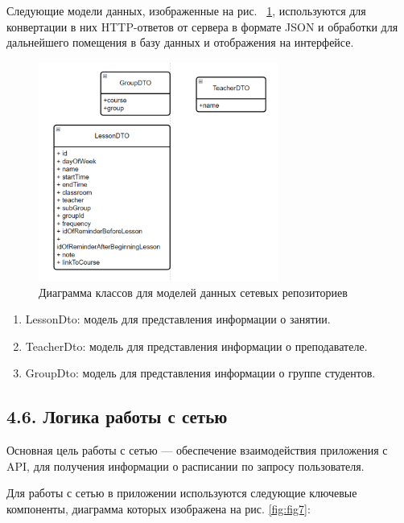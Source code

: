 \documentclass{vsureport}
\begin{document}
Следующие модели данных, изображенные на рис. ~\ref{fig:fig6}, используются для конвертации в них HTTP-ответов от сервера в формате JSON и обработки для дальнейшего помещения в базу данных и отображения на интерфейсе. 
\begin{figure}[H]
	\centering
	\includegraphics[width=0.7\textwidth]{6.png}
	\caption{Диаграмма классов для моделей данных сетевых репозиториев}
	\label{fig:fig6}
\end{figure} 
\begin{enumerate}
	\item LessonDto: модель для представления информации о занятии.
 	\item TeacherDto: модель для представления информации о преподавателе.
	\item GroupDto: модель для представления информации о группе студентов.
\end{enumerate}

\subsection*{4.6. Логика работы с сетью}

Основная цель работы с сетью — обеспечение взаимодействия приложения с API, для получения информации о расписании по запросу пользователя. \cite{ref6}

Для работы с сетью в приложении используются следующие ключевые компоненты, диаграмма которых изображена на рис. \ref{fig:fig7}: 
\end{document}
